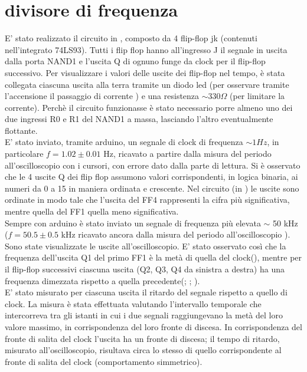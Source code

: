 \section{divisore di frequenza}
E' stato realizzato il circuito in , composto da 4 flip-flop jk (contenuti nell'integrato 74LS93). Tutti i flip flop hanno all'ingresso J il segnale in uscita dalla porta NAND1 e l'uscita Q di ognuno funge da clock per il flip-flop successivo.
Per visualizzare i valori delle uscite dei flip-flop nel tempo, è stata collegata ciascuna uscita alla terra tramite un diodo led (per osservare tramite l'accensione il passaggio di corrente ) e una resistenza $\sim 330 \Omega$ (per limitare la corrente). Perchè il circuito funzionasse è stato necessario porre almeno uno dei due ingressi R0 e R1 del NAND1 a massa, lasciando l'altro eventualmente flottante.\\
E' stato inviato, tramite arduino, un segnale di clock di frequenza $\sim 1 Hz$, in particolare $f = 1.02 \pm 0.01$ Hz, ricavato a partire dalla misura del periodo all'oscilloscopio con i cursori, con errore dato dalla parte di lettura. Si è osservato che le 4 uscite Q dei flip flop assumono valori corrispondenti, in logica binaria, ai numeri da 0 a 15 in maniera ordinata e crescente. Nel circuito (in  ) le uscite sono ordinate in modo tale che l'uscita del FF4 rappresenti la cifra più significativa, mentre  quella del FF1 quella meno significativa.\\
Sempre con arduino è stato inviato un segnale di frequenza più elevata $\sim$ 50 kHz ($f = 50.5 \pm 0.5$ kHz ricavato ancora dalla misura del periodo all'oscilloscopio ). Sono state visualizzate le uscite all'oscilloscopio. E' stato osservato così che la frequenza dell'uscita Q1 del primo FF1 è la metà di quella del clock(), mentre per il flip-flop successivi ciascuna uscita (Q2, Q3, Q4 da sinistra a destra) ha una frequenza dimezzata rispetto a quella precedente(; ; ).\\
E' stato misurato per ciascuna uscita il ritardo del segnale rispetto a quello di clock. La misura è stata effettuata valutando l'intervallo temporale che intercorreva tra gli istanti in cui i due segnali raggiungevano la metà del loro valore massimo, in corrispondenza del loro fronte di discesa. In corrispondenza del fronte di salita del clock l'uscita ha un fronte di discesa; il tempo di ritardo, misurato all'oscilloscopio, risultava circa lo stesso di quello corrispondente al fronte di salita del clock (comportamento simmetrico).\\

